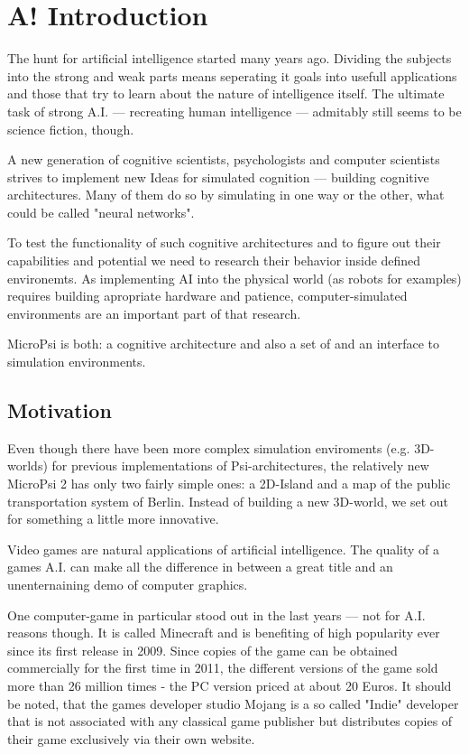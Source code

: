 \chapter{A! Introduction}
The hunt for artificial intelligence started many years ago. Dividing the subjects into the strong and weak parts means seperating it goals into usefull applications and those that try to learn about the nature of intelligence itself. The ultimate task of strong A.I. --- recreating human intelligence --- admitably still seems to be science fiction, though.

A new generation of cognitive scientists, psychologists and computer scientists strives to implement new Ideas for simulated cognition --- building cognitive architectures. Many of them do so by simulating in one way or the other, what could be called "neural networks".

To test the functionality of such cognitive architectures and to figure out their capabilities and potential we need to research their behavior inside defined environemts. As implementing AI into the physical world (as robots for examples) requires building apropriate hardware and patience, computer-simulated environments are an important part of that research.

MicroPsi is both: a cognitive architecture and also a set of and an interface to simulation environments.

\section{Motivation}
Even though there have been more complex simulation enviroments (e.g. 3D-worlds) for previous implementations of Psi-architectures, the relatively new MicroPsi 2 has only two fairly simple ones: a 2D-Island and a map of the public transportation system of Berlin. Instead of building a new 3D-world, we set out for something a little more innovative.

Video games are natural applications of artificial intelligence. The quality of a games A.I. can make all the difference in between a great title and an unenternaining demo of computer graphics.

One computer-game in particular stood out in the last years --- not for A.I. reasons though. It is called Minecraft and is benefiting of high popularity ever since its first release in 2009. Since copies of the game can be obtained commercially for the first time in 2011, the different versions of the game sold more than 26 million times - the PC version priced at about 20 Euros. It should be noted, that the games developer studio Mojang is a so called "Indie" developer that is not associated with any classical game publisher but distributes copies of their game exclusively via their own website.

